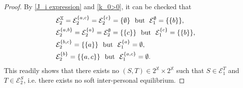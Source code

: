 \documentclass[11pt,reqno]{article}
\numberwithin{equation}{section}
\newcommand{\cE}{\mathcal{E}}
\newcommand{\X}{\mathbb{X}}
\begin{document}
\begin{proof}
By \eqref{J_i expression} and \eqref{k_0>0}, it can be checked that 
\begin{equation}\label{identities}
\begin{split}
&\cE_2^\X = \cE_2^{\{a,c\}} = \cE_2^{\{c\}}= \{\emptyset\}\ \ \hbox{but}\ \ \cE_1^\emptyset=\{\{b\}\},\\
& \cE_2^{\{a,b\}} =\cE_2^{\{a\}} = \cE_2^\emptyset= \{\{c\}\}\ \ \hbox{but}\ \ \cE_1^{\{c\}} = \{\{b\}\},\\
& \cE_2^{\{b,c\}} = \{\{a\}\}\ \ \hbox{but}\ \ \cE_1^{\{a\}} = \emptyset,\\
& \cE_2^{\{b\}} = \{\{a,c\}\}\ \ \hbox{but}\ \ \cE_1^{\{a,c\}}=\emptyset.
\end{split}
\end{equation}
This readily shows that there exists no $(S,T)\in 2^\X\times 2^\X$ such that $S\in\cE_1^T$ and $T\in\cE_2^S$, i.e. there exists no soft inter-personal equilibrium. 


\end{proof}
\end{document}
